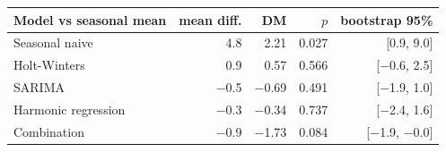 \begin{tabular}{|l|r|r|r|r|}
\hline
\textbf{Model vs seasonal mean} & \textbf{mean diff.} & \textbf{DM} & \textbf{$p$} & \textbf{bootstrap 95\%} \\\hline
Seasonal naive & 4.8 & 2.21 & 0.027 & [0.9, 9.0] \\\hline
Holt-Winters & 0.9 & 0.57 & 0.566 & [\ensuremath{-}0.6, 2.5] \\\hline
SARIMA & \ensuremath{-}0.5 & \ensuremath{-}0.69 & 0.491 & [\ensuremath{-}1.9, 1.0] \\\hline
Harmonic regression & \ensuremath{-}0.3 & \ensuremath{-}0.34 & 0.737 & [\ensuremath{-}2.4, 1.6] \\\hline
Combination & \ensuremath{-}0.9 & \ensuremath{-}1.73 & 0.084 & [\ensuremath{-}1.9, \ensuremath{-}0.0] \\\hline
\end{tabular}
